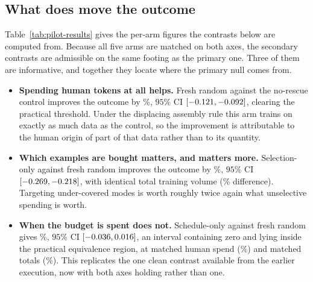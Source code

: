 \begin{table}[h]
\centering
\caption{Per-arm results from the corrected grid, generated by the analysis pipeline from
immutable chain artifacts. AUC regret is the area under the generation-wise held-out human
NLL-regret curve, measured against each chain's own generation-0 value; lower is better. SD
is between-chain standard deviation. Tail retention is the confirmatory outcome at the
final generation; higher is better. Every arm is matched on both budget axes, so every row
is comparable to every other.}
\label{tab:pilot-results}

\end{table}

\subsection{What does move the outcome}

Table~\ref{tab:pilot-results} gives the per-arm figures the contrasts below are computed
from. Because all five arms are matched on both axes, the secondary contrasts are
admissible on the same footing as the primary one. Three of them are informative, and
together they locate where the primary null comes from.

\begin{itemize}
\item \textbf{Spending human tokens at all helps.} Fresh random against the no-rescue
      control improves the outcome by \PilotRandNonePct\%, $95\%$ CI
      $[-0.121, -0.092]$, clearing the practical threshold. Under
      the displacing assembly rule this arm trains on exactly as much data as the control,
      so the improvement is attributable to the human origin of part of that data rather
      than to its quantity.

\item \textbf{Which examples are bought matters, and matters more.} Selection-only against
      fresh random improves the outcome by \PilotSelRandPct\%, $95\%$ CI
      $[-0.269, -0.218]$, with identical total training volume
      (\PilotSelRandTotalPct\% difference). Targeting under-covered modes is worth roughly
      twice again what unselective spending is worth.

\item \textbf{When the budget is spent does not.} Schedule-only against fresh random gives
      \PilotSchedRandPct\%, $95\%$ CI $[-0.036, 0.016]$, an
      interval containing zero and lying inside the practical equivalence region, at
      matched human spend (\PilotSchedRandHumanPct\%) and matched totals
      (\PilotSchedRandTotalPct\%). This replicates the one clean contrast available from
      the earlier execution, now with both axes holding rather than one.
\end{itemize}

